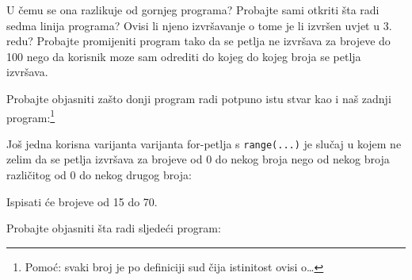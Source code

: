 U čemu se ona razlikuje od gornjeg programa? Probajte sami otkriti šta
radi sedma linija programa? Ovisi li njeno izvršavanje o tome je li
izvršen uvjet u 3. redu? Probajte promijeniti program tako da se petlja ne
izvršava za brojeve do 100 nego da korisnik moze sam odrediti do kojeg do
kojeg broja se petlja izvršava.

Probajte objasniti zašto donji program radi potpuno istu stvar
kao i naš zadnji program:\footnote{Pomoć: svaki broj je po definiciji sud
čija istinitost ovisi o\dots}


Još jedna korisna varijanta varijanta for-petlja s \verb"range(...)" je
slučaj u kojem ne zelim da se petlja izvršava za brojeve od 0 do nekog
broja nego od nekog broja različitog od 0 do nekog drugog broja:


Ispisati će brojeve od 15 do 70.

Probajte objasniti šta radi sljedeći program:


